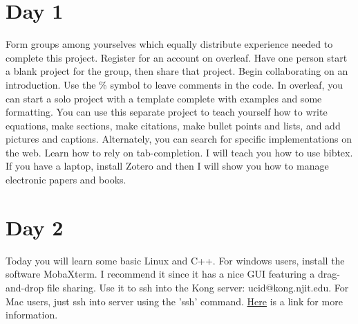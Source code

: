\documentclass{article}
\begin{document}
\section{Day 1}
Form groups among yourselves which equally distribute experience needed to complete this project. Register for an account on overleaf. Have one person start a blank project for the group, then share that project. Begin collaborating on an introduction. Use the \% symbol to leave comments in the code. In overleaf, you can start a solo project with a template complete with examples and some formatting. You can use this separate project to teach yourself how to write equations, make sections, make citations, make bullet points and lists, and add pictures and captions. Alternately, you can search for specific implementations on the web. Learn how to rely on tab-completion. I will teach you how to use bibtex\cite{keyphrase99}. If you have a laptop, install Zotero and then I will show you how to manage electronic papers and books.





\section{Day 2}
Today you will learn some basic Linux and C++. For windows users, install the software MobaXterm. I recommend it since it has a nice GUI featuring a drag-and-drop file sharing. Use it to ssh into the Kong server: ucid@kong.njit.edu. For Mac users, just ssh into server using the 'ssh' command. \href{https://ist.njit.edu/using-SSH-from-Mac-OS-X/}{Here} is a link for more information.
\end{document}
